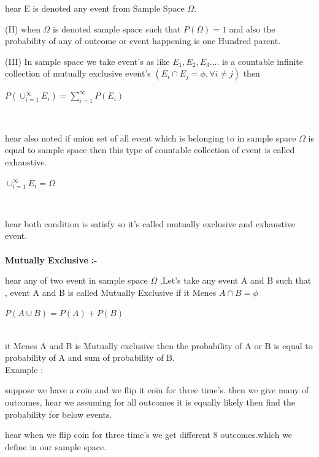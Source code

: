 \documentclass[a4paper,12pt]{article}
\theoremstyle{definition}
\begin{document}
          hear E is denoted any event from Sample Space $\Omega $.\\
\par (II) when $\Omega $ is denoted sample space such that $ P(\Omega) = 1 $
and also the probability of any of outcome or event happening is one Hundred parent.\\
\par (III) In sample space we take event's  as like $ E_1,E_2,E_3....$ is a countable infinite collection of mutually exclusive event's $(E_i \cap E_j = \phi , \forall{i}\neq{j})$ then
          \begin{center}
              $P( \cup_{i=1}^{\infty} E_i ) = \sum_{i=1}^{\infty} P( E_i )$
          \end{center}\\
\par hear also noted if union set of all event which is belonging to in sample space $\Omega$ is equal to sample space then this type of  countable collection of event is called exhaustive.
                 \begin{center}
              $ \cup_{i=1}^{\infty} E_i  = \Omega$
          \end{center}\\  
\par hear both condition is satisfy so it's called mutually exclusive and exhaustive event.\\
\\
\textbf{\underline{}}\textbf{Mutually Exclusive} \textbf{\textbf{:-}} \\
\par hear any of two event in sample space  $\Omega $ ,Let's take any event A and B such that , event A and B is called Mutually Exclusive if it Menes 
$A \cap B = \phi $
 \begin{center}
     $P(A \cup B) = P(A) + P(B) $
\end{center}\\
it Menes A and B is Mutually exclusive then the probability of A or B is  equal to probability of A and sum of probability of B. \\
\vskip 0.25cm
Example :
\par suppose we have a coin and  we flip it coin for three time's. then we give many of outcomes, hear we assuming for all outcomes it is equally likely then find the probability for below events.
\vskip 0.5cm
\par hear when we flip coin for three time's we get  different 8 outcomes.which we define in our sample space.\\
\end{document}
